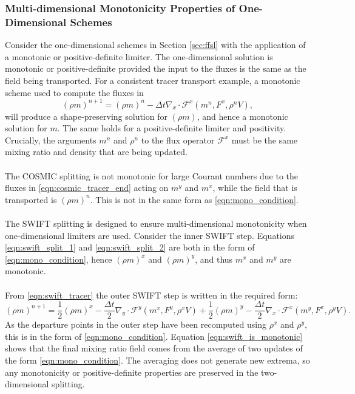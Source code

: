 \documentclass{ametsocV6.1}
\begin{document}
\subsubsection{Multi-dimensional Monotonicity Properties of One-Dimensional Schemes}
Consider the one-dimensional schemes in Section \ref{sec:ffsl} with the application of a monotonic or positive-definite limiter. The one-dimensional solution is monotonic or positive-definite provided the input to the fluxes is the same as the field being transported. For a consistent tracer transport example, a monotonic scheme used to compute the fluxes in
\begin{equation} \label{eqn:mono_condition}
    (\rho m)^{n+1} = (\rho m)^n - \Delta{t} \nabla_x\cdot \mathcal{F}^x(m^n, F^x, \rho^nV), 
\end{equation}
will produce a shape-preserving solution for $(\rho m)$, and hence a monotonic solution for $m$. The same holds for a positive-definite limiter and positivity.
Crucially, the arguments $m^n$ and $\rho^n$ to the flux operator $\mathcal{F}^x$ must be the same mixing ratio and density that are being updated. \\
\\
The COSMIC splitting is not monotonic for large Courant numbers due to the fluxes in \eqref{eqn:cosmic_tracer_end} acting on $m^y$ and $m^x$, while the field that is transported is $(\rho m)^n$. This is not in the same form as \eqref{eqn:mono_condition}. \\ 
\\
The SWIFT splitting is designed to ensure multi-dimensional monotonicity when one-dimensional limiters are used. Consider the inner SWIFT step. Equations \eqref{eqn:swift_split_1} and \eqref{eqn:swift_split_2} are both in the form of \eqref{eqn:mono_condition}, hence $(\rho m)^x$ and $(\rho m)^y$, and thus $m^x$ and $m^y$ are monotonic. \\
\\
From \eqref{eqn:swift_tracer} the outer SWIFT step is written in the required form:
\begin{equation}
    (\rho m)^{n+1}  = \frac{1}{2}(\rho m)^x  -\frac{\Delta{t}}{2}\nabla_y\cdot \mathcal{F}^y(m^x,F^{y},\rho^xV) +  \frac{1}{2}(\rho m)^y - \frac{\Delta{t}}{2}\nabla_x\cdot \mathcal{F}^x(m^y,F^{x},\rho^yV). \label{eqn:swift_is_monotonic}
\end{equation}
As the departure points in the outer step have been recomputed using $\rho^x$ and $\rho^y$, this is in the form of \eqref{eqn:mono_condition}.
Equation \eqref{eqn:swift_is_monotonic} shows that the final mixing ratio field comes from the average of two updates of the form \eqref{eqn:mono_condition}.
The averaging does not generate new extrema, so any monotonicity or positive-definite properties are preserved in the two-dimensional splitting.
\end{document}
